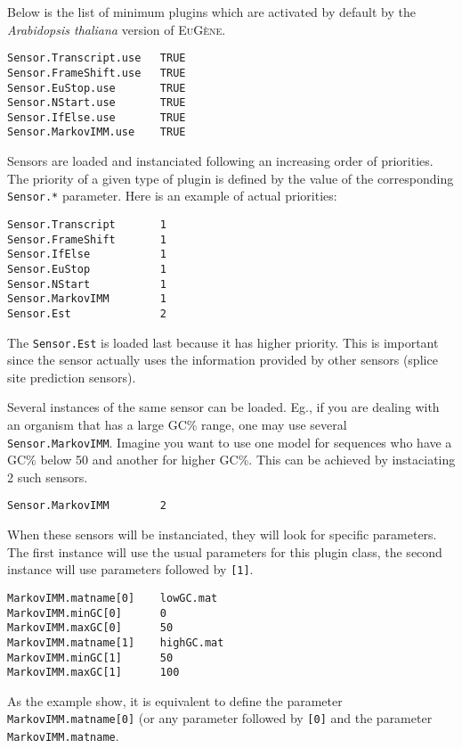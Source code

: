 \documentclass[a4paper,titlepage]{report}
\newcommand{\EuGenie}{\textsc{EuG\`ene}}
\begin{document}
Below is the list of minimum plugins which are activated by default by
the \emph{Arabidopsis thaliana} version of \EuGenie.

\begin{Verbatim}
Sensor.Transcript.use   TRUE
Sensor.FrameShift.use   TRUE
Sensor.EuStop.use       TRUE
Sensor.NStart.use       TRUE
Sensor.IfElse.use       TRUE
Sensor.MarkovIMM.use    TRUE
\end{Verbatim}  

Sensors are loaded and instanciated following an increasing order of
priorities. The priority of a given type of plugin is defined by the
value of the corresponding \texttt{Sensor.*} parameter. Here is an
example of actual priorities:

\begin{Verbatim}
Sensor.Transcript       1
Sensor.FrameShift       1
Sensor.IfElse           1
Sensor.EuStop           1       
Sensor.NStart           1       
Sensor.MarkovIMM        1        
Sensor.Est              2         
\end{Verbatim}

The \texttt{Sensor.Est} is loaded last because it has higher priority.
This is important since the sensor actually uses the information
provided by other sensors (splice site prediction sensors).

Several instances of the same sensor can be loaded. Eg., if you are
dealing with an organism that has a large GC\% range, one may use
several \texttt{Sensor.MarkovIMM}. Imagine you want to use one model
for sequences who have a GC\% below 50 and another for higher GC\%.
This can be achieved by instaciating 2 such sensors. 

\begin{Verbatim}
Sensor.MarkovIMM        2
\end{Verbatim}

When these sensors will be instanciated, they will look for specific
parameters. The first instance will use the usual parameters for this
plugin class, the second instance will use parameters followed by
\texttt{[1]}.

\begin{Verbatim}
MarkovIMM.matname[0]    lowGC.mat 
MarkovIMM.minGC[0]      0
MarkovIMM.maxGC[0]      50
MarkovIMM.matname[1]    highGC.mat
MarkovIMM.minGC[1]      50
MarkovIMM.maxGC[1]      100
\end{Verbatim}

As the example show, it is equivalent to define the parameter
\texttt{MarkovIMM.matname[0]} (or any parameter followed by
\texttt{[0]} and the parameter \texttt{MarkovIMM.matname}.
\end{document}

